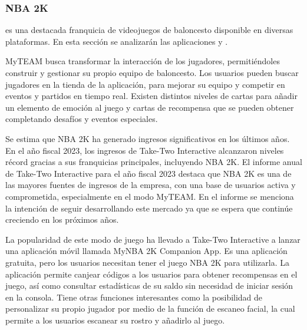 \subsubsection{NBA 2K}
 es una destacada franquicia de videojuegos de baloncesto disponible en diversas plataformas. 
En esta sección se analizarán las aplicaciones  y .

MyTEAM busca transformar la interacción de los jugadores, permitiéndoles construir y gestionar su propio equipo de baloncesto. Los usuarios pueden buscar jugadores en la tienda de la aplicación, para mejorar su equipo y competir en eventos y partidos en tiempo real.
Existen distintos niveles de cartas para añadir un elemento de emoción al juego y cartas de recompensa que se pueden obtener completando desafíos y eventos especiales.

Se estima que NBA 2K ha generado ingresos significativos en los últimos años. En el año fiscal 2023, 
los ingresos de Take-Two Interactive alcanzaron niveles récord gracias a sus franquicias principales, incluyendo NBA 2K. El informe anual de Take-Two Interactive para el año fiscal 2023\cite{take_two_2023} 
destaca que NBA 2K es una de las mayores fuentes de ingresos de la empresa, con una base de usuarios activa y comprometida, especialmente en el modo MyTEAM. 
En el informe se menciona la intención de seguir desarrollando este mercado ya que se espera que continúe creciendo en los próximos años.

La popularidad de este modo de juego ha llevado a Take-Two Interactive a lanzar una aplicación móvil llamada MyNBA 2K Companion App. Es una aplicación gratuita, pero los usuarios necesitan tener el juego NBA 2K para utilizarla.
La aplicación permite canjear códigos a los usuarios para obtener recompensas en el juego, así como consultar estadísticas de su saldo sin necesidad de iniciar sesión en la consola.
Tiene otras funciones interesantes como la posibilidad de personalizar su propio jugador por medio de la función de escaneo facial, la cual permite a los usuarios escanear su rostro y añadirlo al juego.


